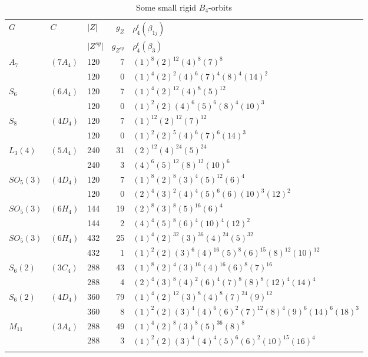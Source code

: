 \documentclass[12pt,a4paper]{article}
\numberwithin{equation}{section}
\numberwithin{table}{section}
\begin{document}
\begin{table}[H]
\centering
\footnotesize
\captionsetup{font=footnotesize}
\caption{Some small rigid $B_4$-orbits}
\label{tab:Data_SmallRigidB4Orbits}
\begin{tabular}{lllrl}
\hline\noalign{\smallskip}
$G$ & $C$ & $ \vert Z \vert $      & $g_Z$             & $\rho^t_4(\beta_{1j})$\\
    &     & $ \vert Z^{sy} \vert $ & $g_{Z^{sy}}$ & $\rho^t_4(\beta_3)$\\
\noalign{\smallskip}\hline\noalign{\smallskip}
$A_7$&$(7A_4)$& 120 & 7 & $(1)^8 (2)^{12} (4)^8 (7)^8$\\
     &        & 120 & 0 & $(1)^4 (2)^2 (4)^6 (7)^4 (8)^4 (14)^2$\\
$S_6$&$(6A_4)$& 120 & 7 & $(1)^4 (2)^{12} (4)^8 (5)^{12}$\\
     &        & 120 & 0 & $(1)^2 (2) (4)^6 (5)^6 (8)^4 (10)^3 $\\
$S_8$&$(4D_4)$& 120 & 7 & $(1)^{12} (2)^{12} (7)^{12} $\\
     &        & 120 & 0 & $(1)^2 (2)^5 (4)^6 (7)^6 (14)^3$\\
$L_3(4)$&$(5A_4)$& 240 & 31 & $(2)^{12} (4)^{24} (5)^{24}$\\
        &        & 240 &  3 & $(4)^6 (5)^{12} (8)^{12} (10)^6$\\
$SO_5(3)$&$(4D_4)$& 120 & 7 & $(1)^8 (2)^8 (3)^4 (5)^{12} (6)^4$\\
         &        & 120 & 0 & $(2)^4 (3)^2 (4)^4 (5)^6 (6) (10)^3 (12)^2$\\
$SO_5(3)$&$(6H_4)$& 144 & 19 & $(2)^8 (3)^8 (5)^{16} (6)^4$\\
         &        & 144 &  2 & $(4)^4 (5)^8 (6)^4 (10)^4 (12)^2$\\
$SO_5(3)$&$(6H_4)$& 432 & 25 & $(1)^4 (2)^{32} (3)^{36} (4)^{24} (5)^{32}$\\
         &        & 432 &  1 & $(1)^2 (2) (3)^6 (4)^{16} (5)^8 (6)^{15} (8)^{12} (10)^{12} $\\
$S_6(2)$&$(3C_4)$& 288 & 43 & $(1)^8 (2)^4 (3)^{16} (4)^{16} (6)^8 (7)^{16}$\\
        &        & 288 &  4 & $(2)^4 (3)^8 (4)^2 (6)^4 (7)^8 (8)^8 (12)^4 (14)^4$\\
$S_6(2)$&$(4D_4)$& 360 & 79 & $(1)^4 (2)^{12} (3)^8 (4)^8 (7)^{24} (9)^{12} $\\
        &        & 360 &  8 & $(1)^2 (2) (3)^4 (4)^6 (6)^2 (7)^{12} (8)^4 (9)^6 (14)^6 (18)^3 $\\
$M_{11}$&$(3A_4)$& 288 & 49 & $(1)^4 (2)^8 (3)^8 (5)^{36} (8)^8 $\\
        &        & 288 &  3 & $(1)^2 (2) (3)^4 (4)^4 (5)^6 (6)^2 (10)^{15} (16)^4 $\\
\noalign{\smallskip}\hline
\end{tabular}
\end{table}
\end{document}
